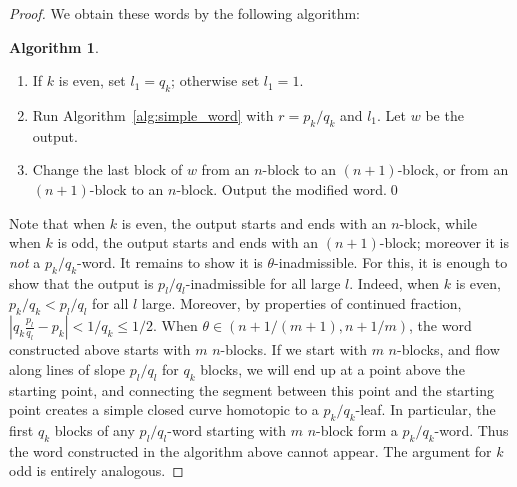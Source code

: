 \documentclass[11pt]{article} %
\theoremstyle{plain}
\theoremstyle{definition}
\newtheorem{alg}[thm]{Algorithm}
\numberwithin{equation}{section}
\begin{document}
\begin{proof}
We obtain these words by the following algorithm:
\begin{alg}\label{alg:tori_inadmissible_word}
\begin{enumerate}[topsep=0mm, itemsep=0mm]
    \item If $k$ is even, set $l_1=q_k$; otherwise set $l_1=1$.
    \item Run Algorithm~\ref{alg:simple_word} with $r=p_k/q_k$ and $l_1$. Let $w$ be the output.
    \item Change the last block of $w$ from an $n$-block to an $(n+1)$-block, or from an $(n+1)$-block to an $n$-block. Output the modified word.\qed
    \end{enumerate}
\end{alg}
Note that when $k$ is even, the output starts and ends with an $n$-block, while when $k$ is odd, the output starts and ends with an $(n+1)$-block; moreover it is \emph{not} a $p_k/q_k$-word. It remains to show it is $\theta$-inadmissible. For this, it is enough to show that the output is $p_l/q_l$-inadmissible for all large $l$. Indeed, when $k$ is even, $p_{k}/q_{k}<p_l/q_l$ for all $l$ large. Moreover, by properties of continued fraction, $|q_{k}\frac{p_l}{q_l}-p_{k}|<1/q_k\le1/2$. When $\theta\in(n+1/(m+1),n+1/m)$, the word constructed above starts with $m$ $n$-blocks. If we start with $m$ $n$-blocks, and flow along lines of slope $p_l/q_l$ for $q_k$ blocks, we will end up at a point above the starting point, and connecting the segment between this point and the starting point creates a simple closed curve homotopic to a $p_k/q_k$-leaf. In particular, the first $q_k$ blocks of any $p_l/q_l$-word starting with $m$ $n$-block form a $p_{k}/q_{k}$-word. Thus the word constructed in the algorithm above cannot appear. The argument for $k$ odd is entirely analogous.
\end{proof}
\end{document}
